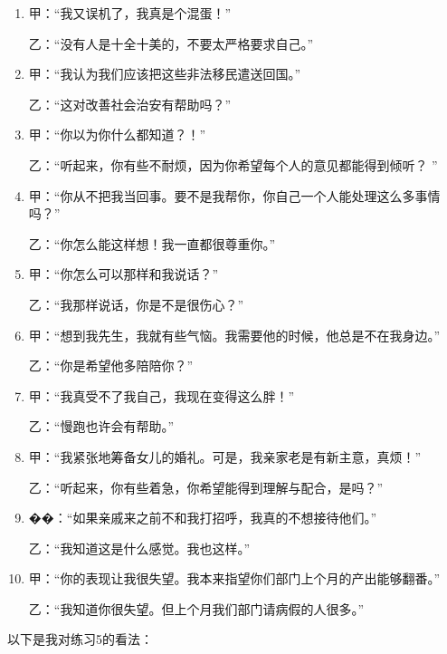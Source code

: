 \documentclass{ctexart}
\begin{document}
\begin{enumerate}[style=nextline]
	\item 甲：``我又误机了，我真是个混蛋！''

	      乙：``没有人是十全十美的，不要太严格要求自己。''
	\item 甲：``我认为我们应该把这些非法移民遣送回国。''

	      乙：``这对改善社会治安有帮助吗？''
	\item 甲：``你以为你什么都知道？！''

	      乙：``听起来，你有些不耐烦，因为你希望每个人的意见都能得到倾听？ ''
	\item 甲：``你从不把我当回事。要不是我帮你，你自己一个人能处理这么多事情吗？''

	      乙：``你怎么能这样想！我一直都很尊重你。''
	\item 甲：``你怎么可以那样和我说话？''

	      乙：``我那样说话，你是不是很伤心？''
	\item 甲：``想到我先生，我就有些气恼。我需要他的时候，他总是不在我身边。''

	      乙：``你是希望他多陪陪你？''
	\item 甲：``我真受不了我自己，我现在变得这么胖！''

	      乙：``慢跑也许会有帮助。''
	\item 甲：``我紧张地筹备女儿的婚礼。可是，我亲家老是有新主意，真烦！''

	      乙：``听起来，你有些着急，你希望能得到理解与配合，是吗？''
	\item ��：``如果亲戚来之前不和我打招呼，我真的不想接待他们。''

	      乙：``我知道这是什么感觉。我也这样。''
	\item 甲：``你的表现让我很失望。我本来指望你们部门上个月的产出能够翻番。''

	      乙：``我知道你很失望。但上个月我们部门请病假的人很多。''
\end{enumerate}

以下是我对练习5的看法：
\end{document}

